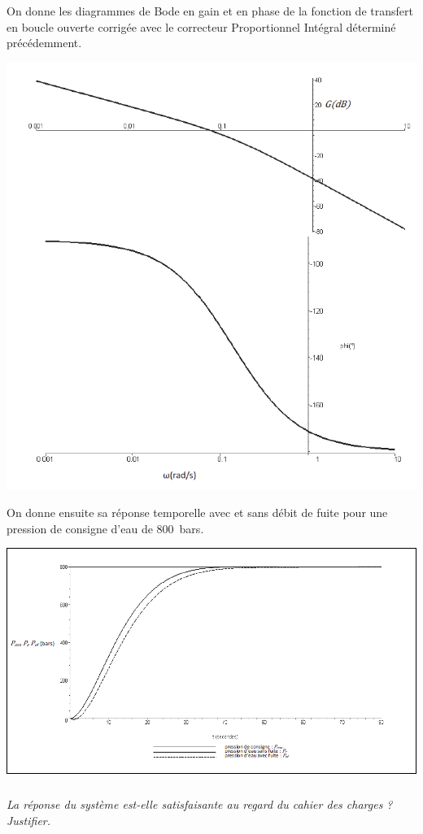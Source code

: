 \documentclass[10pt,fleqn]{article} %
\begin{document}
\begin{multicols}{2}
On donne les diagrammes de Bode en gain et en phase de la fonction de transfert en boucle ouverte corrigée avec le correcteur Proportionnel Intégral déterminé précédemment.

\begin{center}
\includegraphics[width=.8\linewidth]{images/fig_08}
\end{center}


On donne ensuite sa réponse temporelle avec et sans débit de fuite pour une pression de consigne d’eau de \SI{800}{bars}.


\begin{center}
\includegraphics[width=.8\linewidth]{images/fig_09}
\end{center}

\subparagraph{}
\textit{La réponse du système est-elle satisfaisante au regard du cahier des charges ? Justifier.}
\ifprof
\begin{corrige}

\end{corrige}
\else
\fi



\end{multicols}
\end{document}
